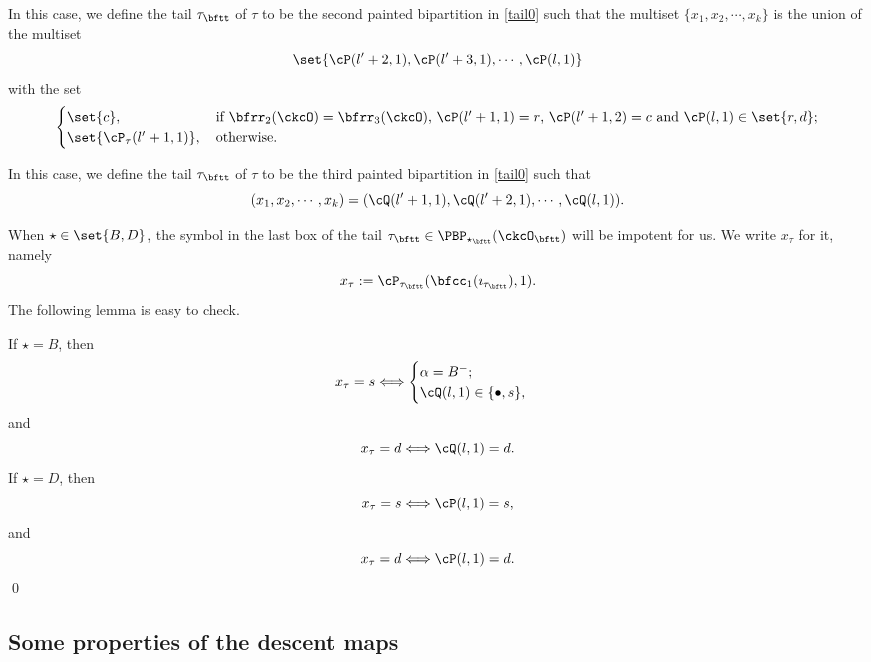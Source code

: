 \documentclass[ssunip]{subfiles}
\begin{document}
\smallskip

 \smallskip




 
 
In this case, we define the tail $\tau_\bftt$ of $\tau$ to be the second painted bipartition in \eqref{tail0} such that the multiset $\{x_1, x_2, \cdots, x_k\}$ is the 
union of the multiset 
\[
\set{\cP(l'+2,1),\cP(l'+3,1),\cdots, \cP(l,1)}
\]
with the set
\[
  \begin{cases}
 \set{c}, &
 \, 
  \text{if $\bfrr_2(\ckcO)=\bfrr_3(\ckcO)$, 
  $\cP(l'+1,1) = r$, $\cP(l'+1,2) = c$ and $\cP(l,1)\in \set{r,d}$};  \\ 
\set{\cP_\tau(l'+1,1)},&
\,   \text{otherwise.}
\end{cases}
\]
 
 \smallskip
 
 \smallskip
 
In this case, we define the tail $\tau_\bftt$ of $\tau$ to be the third painted bipartition in \eqref{tail0} such that 
\[
  (x_1, x_2, \cdots, x_k)= (\cQ(l'+1,1),\cQ(l'+2,1),\cdots, \cQ(l,1)).
\]
 
 
 When $\star \in \set{B,D}$, the symbol in the last box of the tail $\tau_\bftt\in \PBP_{\star_\bftt}(\ckcO_\bftt)$ will be impotent for us. We write $x_\tau$ for it, namely
\[
x_\tau := \cP_{\tau_\bftt}(\bfcc_1(\imath_{\tau_\bftt}),1).
\]
 The following lemma is easy to check.
 
\begin{lem}\label{tailtip}
If $\star=B$, then
\[
x_\tau=s\Longleftrightarrow
\begin{cases}
  \alpha=B^-;\\ 
  \cQ(l,1) \in\{\bullet, s\}, 
  \end{cases}
\]
and 
\[
x_\tau=d \Longleftrightarrow
\cQ(l,1) =d. 
\]
If $\star=D$, then
\[
x_\tau=s\Longleftrightarrow \cP(l,1) = s, 
\]
and 
\[
x_\tau=d\Longleftrightarrow \cP(l,1) =d. 
\]
\qed
\end{lem}







\subsection{Some properties of the descent maps}
\end{document}
